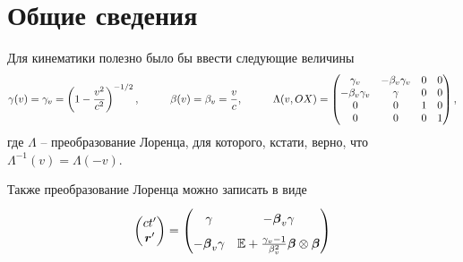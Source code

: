 \section{Общие сведения}

Для кинематики полезно было бы ввести следующие величины
\begin{equation*}
    \gamma(v) = \gamma_v = \left(1 - \frac{v^2}{c^2}\right)^{-1/2},
    \hspace{1 cm}
    \beta(v) = \beta_v = \frac{v}{c},
    \hspace{1 cm}
    \Lambda(v, OX) = \begin{pmatrix}
        \gamma_v & - \beta_v \gamma_v & 0 & 0\\
        - \beta_v \gamma_v & \gamma & 0 & 0\\
        0 & 0 & 1 & 0\\
        0 & 0 & 0 & 1\\
    \end{pmatrix},
\end{equation*}
где $\Lambda$ -- преобразование Лоренца, для которого, кстати, верно, что $\Lambda^{-1} (v) = \Lambda(-v)$.

Также преобразование Лоренца можно записать в виде
\begin{equation}
\label{LORENTS}
    \begin{pmatrix}
        c t' \\ \vc{r}'
    \end{pmatrix} = 
    \begin{pmatrix}
        \gamma & - \vc{\beta}_v \gamma 
        \vphantom{\dfrac{1}{2}} \\
        - \vc{\beta}_v \gamma & \mathbb{E} + \frac{\gamma_v - 1}{\beta_v^2} \vc{\beta} \otimes \vc{\beta}  
        \vphantom{\dfrac{1}{2}} \\
    \end{pmatrix}
\end{equation}